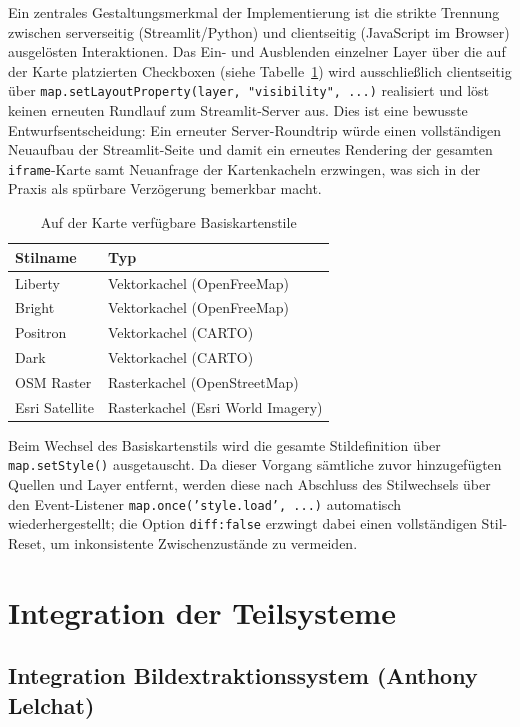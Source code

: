 \documentclass[12pt,a4paper]{report}
\begin{document}
Ein zentrales Gestaltungsmerkmal der Implementierung ist die strikte Trennung zwischen serverseitig (Streamlit/Python) und clientseitig (JavaScript im Browser) ausgelösten Interaktionen. Das Ein- und Ausblenden einzelner Layer über die auf der Karte platzierten Checkboxen (siehe Tabelle~\ref{tab:layer}) wird ausschließlich clientseitig über \texttt{map.setLayoutProperty(layer, "visibility", ...)} realisiert und löst keinen erneuten Rundlauf zum Streamlit-Server aus. Dies ist eine bewusste Entwurfsentscheidung: Ein erneuter Server-Roundtrip würde einen vollständigen Neuaufbau der Streamlit-Seite und damit ein erneutes Rendering der gesamten \texttt{iframe}-Karte samt Neuanfrage der Kartenkacheln erzwingen, was sich in der Praxis als spürbare Verzögerung bemerkbar macht.

\begin{table}[h!]
\centering
\caption{Auf der Karte verfügbare Basiskartenstile}
\label{tab:layer}
\begin{tabular}{ll}
\toprule
\textbf{Stilname} & \textbf{Typ} \\
\midrule
Liberty & Vektorkachel (OpenFreeMap) \\
Bright & Vektorkachel (OpenFreeMap) \\
Positron & Vektorkachel (CARTO) \\
Dark & Vektorkachel (CARTO) \\
OSM Raster & Rasterkachel (OpenStreetMap) \\
Esri Satellite & Rasterkachel (Esri World Imagery) \\
\bottomrule
\end{tabular}
\end{table}

Beim Wechsel des Basiskartenstils wird die gesamte Stildefinition über \texttt{map.setStyle()} ausgetauscht. Da dieser Vorgang sämtliche zuvor hinzugefügten Quellen und Layer entfernt, werden diese nach Abschluss des Stilwechsels über den Event-Listener \texttt{map.once('style.load', ...)} automatisch wiederhergestellt; die Option \texttt{diff:false} erzwingt dabei einen vollständigen Stil-Reset, um inkonsistente Zwischenzustände zu vermeiden.

\section{Integration der Teilsysteme}

\subsection{Integration Bildextraktionssystem (Anthony Lelchat)}
\end{document}
